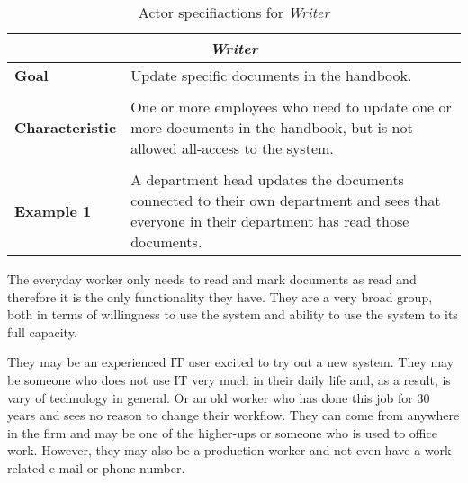 \begin{table}[H]
	\begin{tabular}{l p{11.3cm}}
		\hline
		\multicolumn{2}{c}{\textbf{\textit{Writer}}}\\
		\hline
		
		\textbf{Goal} & Update specific documents in the handbook. \\
	 	 &  \\
	 	 
		\textbf{Characteristic} &  One or more employees who need to update one or more documents in the handbook, but is not allowed all-access to the system. \\
		 &  \\
		 
		\textbf{Example 1} 
		& A department head updates the documents connected to their own department and sees that everyone in their department has read those documents.\\
		
		\hline
	\end{tabular}
	\caption{Actor specifiactions for \textit{Writer}}\label{tab:Actor-write}
\end{table}

The everyday worker only needs to read and mark documents as read and therefore it is the only functionality they have.
They are a very broad group, both in terms of willingness to use the system and ability to use the system to its full capacity.

They may be an experienced IT user excited to try out a new system.
They may be someone who does not use IT very much in their daily life and, as a result, is vary of technology in general.
Or an old worker who has done this job for 30 years and sees no reason to change their workflow.
They can come from anywhere in the firm and may be one of the higher-ups or someone who is used to office work.
However, they may also be a production worker and not even have a work related e-mail or phone number.

